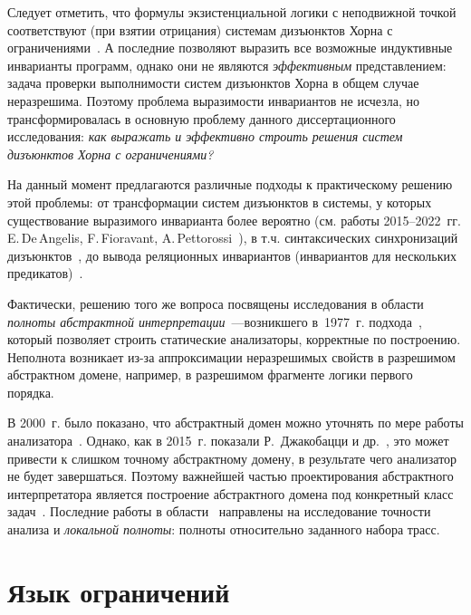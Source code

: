 Следует отметить, что формулы экзистенциальной логики с неподвижной точкой соответствуют (при взятии отрицания) системам дизъюнктов Хорна с ограничениями~\cite{Bjorner2015}.
А последние позволяют выразить все возможные индуктивные инварианты программ, однако они не являются \emph{эффективным} представлением: задача проверки выполнимости систем дизъюнктов Хорна в общем случае неразрешима.
Поэтому проблема выразимости инвариантов не исчезла, но трансформировалась в основную проблему данного диссертационного исследования:
\emph{как выражать и эффективно строить решения систем дизъюнктов Хорна с ограничениями?}


На данный момент предлагаются различные подходы к практическому решению этой проблемы: от трансформации систем дизъюнктов в системы, у которых существование выразимого инварианта более вероятно (см. работы \numrange{2015}{2022}~гг. E.\,De\,Angelis,
F.\,Fioravant, A.\,Pettorossi~\cite{angelis_fioravanti_pettorossi_proietti_2015,10.1007/978-3-662-53413-7_8,10.1093/logcom/exab090,pettorossi_proietti_2022,10.1007/978-3-030-51074-9_6,angelis_fioravanti_pettorossi_proietti_2018}), в т.\:ч. синтаксических синхронизаций дизъюнктов~\cite{10.1007/978-3-662-53413-7_8,LPAR-21:Synchronizing_Constrained_Horn_Clauses}, до вывода реляционных инвариантов (инвариантов для нескольких предикатов)~\cite{mordvinov2020,DBLP:journals/corr/abs-2304-12588}.

Фактически, решению того же вопроса посвящены исследования в области \emph{полноты абстрактной интерпретации}~---возникшего в~1977~г. подхода~\cite{10.1145/512950.512973}, который позволяет строить статические анализаторы, корректные по построению.
Неполнота возникает из-за аппроксимации неразрешимых свойств в разрешимом абстрактном домене, например, в разрешимом фрагменте логики первого порядка.


В 2000~г. было показано, что абстрактный домен можно уточнять по мере работы анализатора~\cite{10.1145/333979.333989}. Однако, как в 2015~г. показали Р.~Джакобацци и др.~\cite{giacobazzi2015analyzing}, это может привести к слишком точному абстрактному домену, в результате чего анализатор не будет завершаться.
Поэтому важнейшей частью проектирования абстрактного интерпретатора является построение абстрактного домена под конкретный класс задач~\cite{10.1093/logcom/2.4.511}.
Последние работы в области~\cite{10.1145/3498721,9470608} направлены на исследование точности анализа и \emph{локальной полноты}: полноты относительно заданного набора трасс.

\section{Язык ограничений}\label{sec:background/assertionLang}


